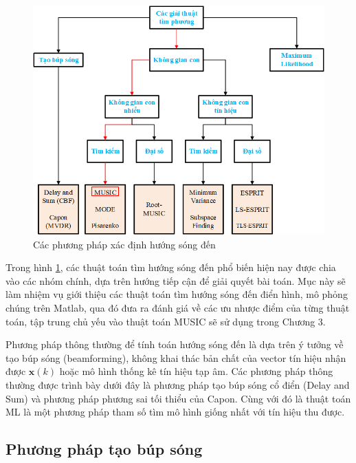 \begin{figure} [h]
	\centering
	\includegraphics[width= 1\linewidth]{figures/DOA_algorithm.png}
	\caption{Các phương pháp xác định hướng sóng đến}
	\label{fig:overview}
\end{figure}

Trong hình \ref{fig:overview}, các thuật toán tìm hướng sóng đến phổ biến hiện nay được chia vào các nhóm chính, dựa trên hướng tiếp cận để giải quyết bài toán. Mục này sẽ làm nhiệm vụ giới thiệu các thuật toán tìm hướng sóng đến điển hình, mô phỏng chúng trên Matlab, qua đó đưa ra đánh giá về các ưu nhược điểm của từng thuật toán, tập trung chủ yếu vào thuật toán MUSIC sẽ sử dụng trong Chương 3.

Phương pháp thông thường để tính toán hướng sóng đến là dựa trên ý tưởng về tạo búp sóng (beamforming), không khai thác bản chất của vector tín hiệu nhận được $\mathbf{x}(k)$ hoặc mô hình thống kê tín hiệu tạp âm. Các phương pháp thông thường được trình bày dưới đây là phương pháp tạo búp sóng cổ điển (Delay and Sum) và phương pháp phương sai tối thiểu của Capon. Cùng với đó là thuật toán ML là một phương pháp tham số tìm mô hình giống nhất với tín hiệu thu được.

\subsection{Phương pháp tạo búp sóng}

